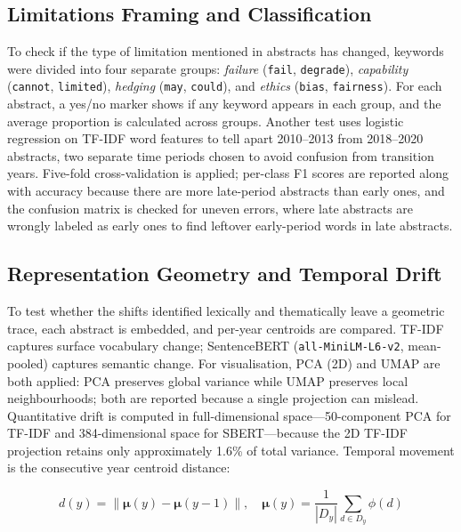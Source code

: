 \subsection{Limitations Framing and Classification}

To check if the type of limitation mentioned in abstracts has changed, keywords were divided into four separate groups:  \textit{failure} (\texttt{fail}, \texttt{degrade}), \textit{capability} (\texttt{cannot}, \texttt{limited}), \textit{hedging} (\texttt{may}, \texttt{could}), and \textit{ethics} (\texttt{bias}, \texttt{fairness}). For each abstract, a yes/no marker shows if any keyword appears in each group, and the average proportion is calculated across groups. Another test uses logistic regression on TF-IDF word features to tell apart 2010–2013 from 2018–2020 abstracts, two separate time periods chosen to avoid confusion from transition years. Five-fold cross-validation is applied; per-class F1 scores are reported along with accuracy because there are more late-period abstracts than early ones, and the confusion matrix is checked for uneven errors, where late abstracts are wrongly labeled as early ones to find leftover early-period words in late abstracts.

\subsection{Representation Geometry and Temporal Drift}

To test whether the shifts identified lexically and thematically leave a geometric trace, each abstract is embedded, and per-year centroids are compared. TF-IDF captures surface vocabulary change; SentenceBERT (\texttt{all-MiniLM-L6-v2}, mean-pooled) captures semantic change. For visualisation, PCA (2D) and UMAP are both applied: PCA preserves global variance while UMAP preserves local neighbourhoods; both are reported because a single projection can mislead. Quantitative drift is computed in full-dimensional space---50-component PCA for TF-IDF and 384-dimensional space for SBERT---because the 2D TF-IDF projection retains only approximately 1.6\% of total variance. Temporal movement is the consecutive year centroid distance:

{\small
\begin{equation}
    d(y) = \| \boldsymbol{\mu}(y) - \boldsymbol{\mu}(y-1) \|, \quad
    \boldsymbol{\mu}(y) = \frac{1}{|D_y|} \sum_{d \in D_y} \phi(d)
    \tag{3}
\end{equation}
}


